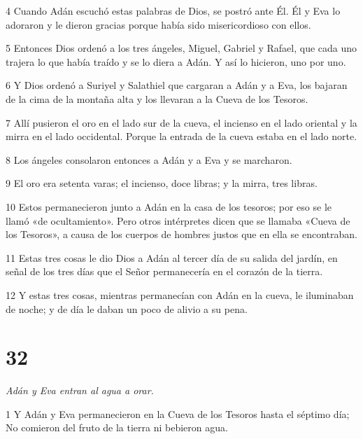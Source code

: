 \par 4 Cuando Adán escuchó estas palabras de Dios, se postró ante Él. Él y Eva lo adoraron y le dieron gracias porque había sido misericordioso con ellos.

\par 5 Entonces Dios ordenó a los tres ángeles, Miguel, Gabriel y Rafael, que cada uno trajera lo que había traído y se lo diera a Adán. Y así lo hicieron, uno por uno.

\par 6 Y Dios ordenó a Suriyel y Salathiel que cargaran a Adán y a Eva, los bajaran de la cima de la montaña alta y los llevaran a la Cueva de los Tesoros.

\par 7 Allí pusieron el oro en el lado sur de la cueva, el incienso en el lado oriental y la mirra en el lado occidental. Porque la entrada de la cueva estaba en el lado norte.

\par 8 Los ángeles consolaron entonces a Adán y a Eva y se marcharon.

\par 9 El oro era setenta varas; el incienso, doce libras; y la mirra, tres libras.

\par 10 Estos permanecieron junto a Adán en la casa de los tesoros; por eso se le llamó «de ocultamiento». Pero otros intérpretes dicen que se llamaba «Cueva de los Tesoros», a causa de los cuerpos de hombres justos que en ella se encontraban.

\par 11 Estas tres cosas le dio Dios a Adán al tercer día de su salida del jardín, en señal de los tres días que el Señor permanecería en el corazón de la tierra.

\par 12 Y estas tres cosas, mientras permanecían con Adán en la cueva, le iluminaban de noche; y de día le daban un poco de alivio a su pena.

\chapter{32}

\par \textit{Adán y Eva entran al agua a orar.}

\par 1 Y Adán y Eva permanecieron en la Cueva de los Tesoros hasta el séptimo día; No comieron del fruto de la tierra ni bebieron agua.

